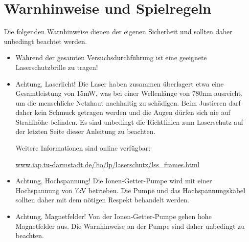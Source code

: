 \documentclass[
class=book,
accentcolor=1b,
custommargins=geometry,
fontsize=11pt,
thesis={type=Versuchsanleitung},
ruledheaders=all,
headline=false,
instbox=false,
marginpar=false,
title=small,
ignore-missing-data=true,
twoside=false,
pdfa=false %
]{apqpub}
\begin{document}
	\submissiondate{\today}
	\examdate{\today} %
	
	
	\maketitle
	\frontmatter
	
	 
	\tableofcontents
	
	\mainmatter
	\setcounter{page}{1}
	
	
	
	
\section{Warnhinweise und Spielregeln}

Die folgenden Warnhinweise dienen der eigenen Sicherheit und sollten daher unbedingt beachtet werden.

\begin{itemize}
	\item Während der gesamten Versuchsdurchführung ist eine geeignete Laserschutzbrille zu tragen!
	
	\item Achtung, Laserlicht! Die Laser haben zusammen überlagert etwa eine Gesamtleistung von 15mW, was bei
	einer Wellenlänge von 780nm ausreicht, um die menschliche Netzhaut nachhaltig zu schädigen. Beim Justieren
	darf daher kein Schmuck getragen werden und die Augen dürfen sich nie auf Strahlhöhe befinden.
	Es sind unbedingt die Richtlinien zum Laserschutz auf der letzten Seite dieser Anleitung zu beachten.
	
	Weitere Informationen sind online verfügbar:
	
	\url{www.iap.tu-darmstadt.de/lto/lp/laserschutz/lss_frames.html}
	
	\item Achtung, Hochspannung! Die Ionen-Getter-Pumpe wird mit einer Hochspannung von 7kV betrieben. Die
	Pumpe und das Hochspannungskabel sollten daher mit dem nötigen Respekt behandelt werden.
	
	\item Achtung, Magnetfelder! Von der Ionen-Getter-Pumpe gehen hohe Magnetfelder aus. Die Warnhinweise an
	der Pumpe sind daher unbedingt zu beachten.
\end{itemize}
\end{document}
